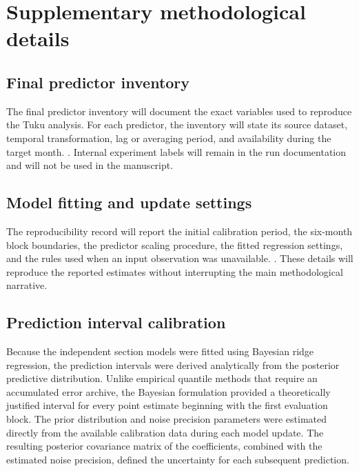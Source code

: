 \section{Supplementary methodological details}
\label{app:methods}

\subsection{Final predictor inventory}
\label{app:predictors}

The final predictor inventory will document the exact variables used to reproduce the Tuku analysis. For each predictor, the inventory will state its source dataset, temporal transformation, lag or averaging period, and availability during the target month. . Internal experiment labels will remain in the run documentation and will not be used in the manuscript.

\subsection{Model fitting and update settings}
\label{app:model_settings}

The reproducibility record will report the initial calibration period, the six-month block boundaries, the predictor scaling procedure, the fitted regression settings, and the rules used when an input observation was unavailable. . These details will reproduce the reported estimates without interrupting the main methodological narrative.

\subsection{Prediction interval calibration}
\label{app:intervals}

Because the independent section models were fitted using Bayesian ridge regression, the prediction intervals were derived analytically from the posterior predictive distribution. Unlike empirical quantile methods that require an accumulated error archive, the Bayesian formulation provided a theoretically justified interval for every point estimate beginning with the first evaluation block. The prior distribution and noise precision parameters were estimated directly from the available calibration data during each model update. The resulting posterior covariance matrix of the coefficients, combined with the estimated noise precision, defined the uncertainty for each subsequent prediction.

